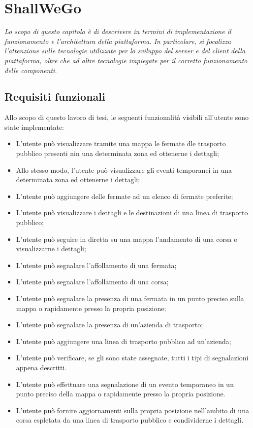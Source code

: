 \chapter{ShallWeGo}
\newenvironment{code}{\captionsetup{type=listing}}{}

\begin{citazione}
    \textit{Lo scopo di questo capitolo è di descrivere in termini di implementazione il funzionamento e l'architettura della piattaforma. In particolare, si focalizza l'attenzione sulle tecnologie utilizzate per lo sviluppo del server e del client della piattaforma, oltre che ad altre tecnologie impiegate per il corretto funzionamento delle componenti.}
\end{citazione}

\newpage

\section{Requisiti funzionali}
    Allo scopo di questo lavoro di tesi, le seguenti funzionalità visibili all'utente sono state implementate:

    \begin{itemize}
        \item L'utente può visualizzare tramite una mappa le fermate dle trasporto pubblico presenti nin una determinata zona ed ottenerne i dettagli;
        \item Allo stesso modo, l'utente può visualizzare gli eventi temporanei in una determinata zona ed ottenerne i dettagli;
        \item L'utente può aggiungere delle fermate ad un elenco di fermate preferite;
        \item L'utente può visualizzare i dettagli e le destinazioni di una linea di trasporto pubblico;
        \item L'utente può seguire in diretta su una mappa l'andamento di una corsa e visualizzarne i dettagli;
        \item L'utente può segnalare l'affollamento di una fermata;
        \item L'utente può segnalare l'affollamento di una corsa;
        \item L'utente può segnalare la presenza di una fermata in un punto preciso sulla mappa o rapidamente presso la propria posizione;
        \item L'utente può segnalare la presenza di un'azienda di trasporto;
        \item L'utente può aggiungere una linea di trasporto pubblico ad un'azienda;
        \item L'utente può verificare, se gli sono state assegnate, tutti i tipi di segnalazioni appena descritti.
        \item L'utente può effettuare una segnalazione di un evento temporaneo in un punto preciso della mappa o rapidamente presso la propria posizione.
        \item L'utente può fornire aggiornamenti sulla propria posizione nell'ambito di una corsa espletata da una linea di trasporto pubblico e condividerne i dettagli.
    \end{itemize}

